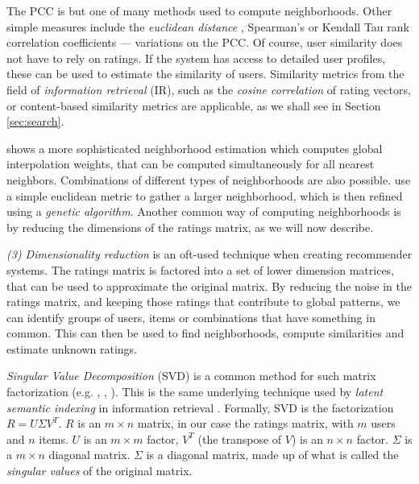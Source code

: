 The PCC is but one of many methods used to compute neighborhoods. 
Other simple measures include the \emph{euclidean distance} \cite[p.10]{Segaran2007},
Spearman's or Kendall Tau rank correlation coefficients \cite[p.30]{Herlocker2004} --- 
variations on the PCC.
Of course, user similarity does not have to rely on ratings. 
If the system has access to detailed user profiles, these can be used
to estimate the similarity of users.
Similarity metrics from the field of \emph{information retrieval} (IR),
such as the \emph{cosine correlation} of rating vectors,
or content-based similarity metrics are applicable,
as we shall see in Section \ref{sec:search}.

\cite{Bell2007a} shows a more sophisticated neighborhood estimation which computes global interpolation weights,
that can be computed simultaneously for all nearest neighbors.
Combinations of different types of neighborhoods are also possible. 
\cite{Ujjin} use a simple euclidean metric to gather a larger neighborhood, which is then refined using a \emph{genetic algorithm}.
Another common way of computing neighborhoods is by reducing the dimensions of the ratings matrix, as we will now describe.

\vspace{2em}

\noindent
\emph{(3) Dimensionality reduction} is an oft-used technique when creating recommender systems.
The ratings matrix is factored into a set of lower dimension matrices, that can be used to approximate the original matrix.
By reducing the noise in the ratings matrix, and keeping those ratings that contribute to global patterns,
we can identify groups of users, items or combinations that have something in common.
This can then be used to find neighborhoods, compute similarities and estimate unknown ratings.

\emph{Singular Value Decomposition} (SVD) is a common method for such matrix factorization (e.g. \citet[p.5]{Billsus}, \citet{Sun2005}, \citet{Bell2007}).  
This is the same underlying technique used by \emph{latent semantic indexing} in information retrieval \cite[p.44]{Baeza-Yates1999}.
Formally, SVD is the factorization $R = U \Sigma V^{T}$. 
$R$ is an $m \times n$ matrix, in our case the ratings matrix, with $m$ users and $n$ items. 
$U$ is an $m \times m$ factor, $V^{T}$ (the transpose of $V$) is an $n \times n$ factor.
$\Sigma$ is a $m \times n$ diagonal matrix. 
$\Sigma$ is a diagonal matrix, made up of what is called the \emph{singular values} of the original matrix.

